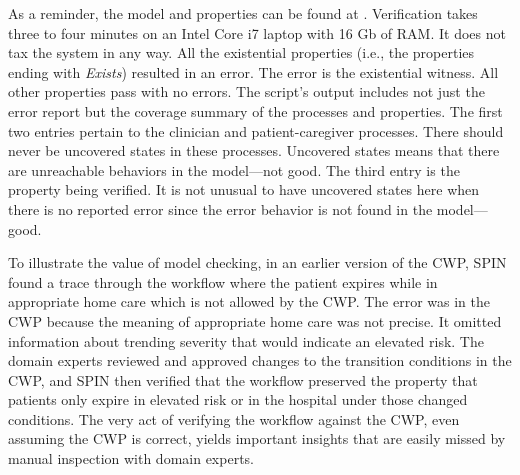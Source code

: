 
\begin{comment}
\begin{figure*}[t]
  \begin{center}
    \begin{tabular}{c}
      \texttt{[image: ../figs/proof-digest.png]}
    \end{tabular}
  \end{center}
\caption{Some of the verification results from the SPIN model checker.}
\label{fig:proof}
\end{figure*}
The results for the state properties for \texttt{ptInElevatedRiskHomeCare} with the measured time verifying the entire model is shown in \figref{fig:proof}.
\end{comment}

As a reminder, the model and properties can be found at \cite{repo}.
Verification takes three to four minutes on an Intel Core i7 laptop with 16 Gb of RAM. It does not tax the system in any way.
All the existential properties (i.e., the properties ending with \emph{Exists}) resulted in an error. The error is the existential witness.
All other properties pass with no errors. The script's output includes not just the error report but the coverage summary of the processes and properties.
The first two entries pertain to the clinician and patient-caregiver processes. There should never be uncovered states in these processes.
Uncovered states means that there are unreachable behaviors in the model---not good. The third entry is the property being verified.
It is not unusual to have uncovered states here when there is no reported error since the error behavior is not found in the model---good.

To illustrate the value of model checking, in an earlier version of the CWP, SPIN found a trace through the workflow where the patient expires while in appropriate home care which is not allowed by the CWP. The error was in the CWP because the meaning of appropriate home care was not precise. It omitted information about trending severity that would indicate an elevated risk. The domain experts reviewed and approved changes to the transition conditions in the CWP, and SPIN then verified that the workflow preserved the property that patients only expire in elevated risk or in the hospital under those changed conditions. The very act of verifying the workflow against the CWP, even assuming the CWP is correct, yields important insights that are easily missed by manual inspection with domain experts.